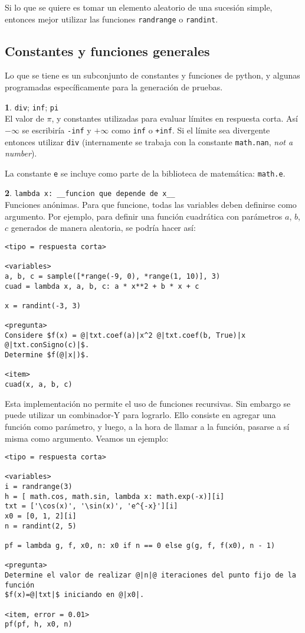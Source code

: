 \documentclass[12pt]{article}
\theoremstyle{definition}
\newtheorem{funcion}{}[section]
\begin{document}
Si lo que se quiere es tomar un elemento aleatorio de una sucesión simple, entonces mejor utilizar las funciones \verb|randrange| o \verb|randint|. 

\subsection{Constantes y funciones generales}
Lo que se tiene es un subconjunto de constantes y funciones de python, y algunas programadas específicamente para la generación de pruebas.

\begin{funcion}
\verb|div|; \verb|inf|; \verb|pi| \\[1ex]
  El valor de $\pi$, y constantes utilizadas para evaluar límites en respuesta corta. Así $-\infty$ se escribiría \verb|-inf| y $+\infty$ como \verb|inf| o \verb|+inf|. Si el límite sea divergente entonces utilizar \verb|div| (internamente se trabaja con la constante \verb|math.nan|, \emph{not a number}).

  La constante \verb|e| se incluye como parte de la biblioteca de matemática: \verb|math.e|.
\end{funcion}

\begin{funcion}
  \verb|lambda x: __funcion que depende de x__| \\[1ex]
  Funciones anónimas. Para que funcione, todas las variables deben definirse como argumento. Por ejemplo, para definir una función cuadrática con parámetros $a$, $b$, $c$ generados de manera aleatoria, se podría hacer así:
\begin{verbatim}
<tipo = respuesta corta>

<variables>
a, b, c = sample([*range(-9, 0), *range(1, 10)], 3)
cuad = lambda x, a, b, c: a * x**2 + b * x + c

x = randint(-3, 3)

<pregunta>
Considere $f(x) = @|txt.coef(a)|x^2 @|txt.coef(b, True)|x @|txt.conSigno(c)|$. 
Determine $f(@|x|)$.

<item>
cuad(x, a, b, c)
\end{verbatim}

Esta implementación no permite el uso de funciones recursivas. Sin embargo se puede utilizar un combinador-Y para lograrlo. Ello consiste en agregar una función como parámetro, y luego, a la hora de llamar a la función, pasarse a sí misma como argumento. Veamos un ejemplo:

\begin{verbatim}
<tipo = respuesta corta>

<variables>
i = randrange(3)
h = [ math.cos, math.sin, lambda x: math.exp(-x)][i]
txt = ['\cos(x)', '\sin(x)', 'e^{-x}'][i]
x0 = [0, 1, 2][i]
n = randint(2, 5)

pf = lambda g, f, x0, n: x0 if n == 0 else g(g, f, f(x0), n - 1)

<pregunta>
Determine el valor de realizar @|n|@ iteraciones del punto fijo de la función 
$f(x)=@|txt|$ iniciando en @|x0|.

<item, error = 0.01>
pf(pf, h, x0, n)
\end{verbatim}

\end{funcion}
\end{document}
